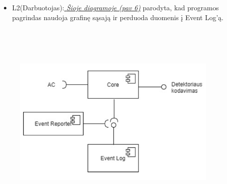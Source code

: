 \documentclass[oneside]{VUMIFPSkursinis}
\begin{document}
\begin{itemize}
		\item L2(Darbuotojas):\hyperref[fig:l2darb]{\textit{  Šioje diagramoje (pav 6)}}  parodyta, kad programos pagrindas naudoja grafinę sąsają ir perduoda duomenis į Event Log’ą. 
\end{itemize}
\begin{figure}[H]
\centering	
	\includegraphics[width=10cm,height=10cm,keepaspectratio]{l2det.png}
	\caption{}
	\label{fig:l2det}
\end{figure}
		
\end{document}
